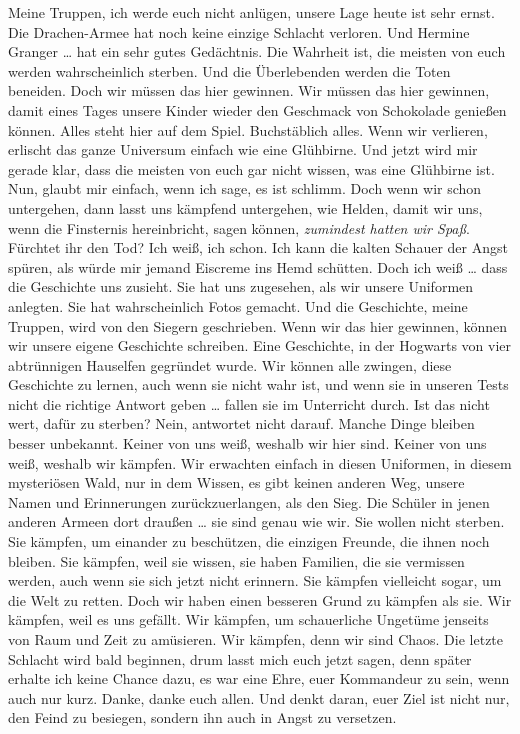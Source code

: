 Meine Truppen, ich werde euch nicht anlügen, unsere Lage heute ist sehr ernst. Die Drachen-Armee hat noch keine einzige Schlacht verloren. Und Hermine Granger … hat ein sehr gutes Gedächtnis. Die Wahrheit ist, die meisten von euch werden wahrscheinlich sterben. Und die Überlebenden werden die Toten beneiden. Doch wir müssen das hier gewinnen. Wir müssen das hier gewinnen, damit eines Tages unsere Kinder wieder den Geschmack von Schokolade genießen können. Alles steht hier auf dem Spiel. Buchstäblich alles. Wenn wir verlieren, erlischt das ganze Universum einfach wie eine Glühbirne. Und jetzt wird mir gerade klar, dass die meisten von euch gar nicht wissen, was eine Glühbirne ist. Nun, glaubt mir einfach, wenn ich sage, es ist schlimm. Doch wenn wir schon untergehen, dann lasst uns kämpfend untergehen, wie Helden, damit wir uns, wenn die Finsternis hereinbricht, sagen können, \emph{zumindest hatten wir Spaß}. Fürchtet ihr den Tod? Ich weiß, ich schon. Ich kann die kalten Schauer der Angst spüren, als würde mir jemand Eiscreme ins Hemd schütten. Doch ich weiß … dass die Geschichte uns zusieht. Sie hat uns zugesehen, als wir unsere Uniformen anlegten. Sie hat wahrscheinlich Fotos gemacht. Und die Geschichte, meine Truppen, wird von den Siegern geschrieben. Wenn wir das hier gewinnen, können wir unsere eigene Geschichte schreiben. Eine Geschichte, in der Hogwarts von vier abtrünnigen Hauselfen gegründet wurde. Wir können alle zwingen, diese Geschichte zu lernen, auch wenn sie nicht wahr ist, und wenn sie in unseren Tests nicht die richtige Antwort geben … fallen sie im Unterricht durch. Ist das nicht wert, dafür zu sterben? Nein, antwortet nicht darauf. Manche Dinge bleiben besser unbekannt. Keiner von uns weiß, weshalb wir hier sind. Keiner von uns weiß, weshalb wir kämpfen. Wir erwachten einfach in diesen Uniformen, in diesem mysteriösen Wald, nur in dem Wissen, es gibt keinen anderen Weg, unsere Namen und Erinnerungen zurückzuerlangen, als den Sieg. Die Schüler in jenen anderen Armeen dort draußen … sie sind genau wie wir. Sie wollen nicht sterben. Sie kämpfen, um einander zu beschützen, die einzigen Freunde, die ihnen noch bleiben. Sie kämpfen, weil sie wissen, sie haben Familien, die sie vermissen werden, auch wenn sie sich jetzt nicht erinnern. Sie kämpfen vielleicht sogar, um die Welt zu retten. Doch wir haben einen besseren Grund zu kämpfen als sie. Wir kämpfen, weil es uns gefällt. Wir kämpfen, um schauerliche Ungetüme jenseits von Raum und Zeit zu amüsieren. Wir kämpfen, denn wir sind Chaos. Die letzte Schlacht wird bald beginnen, drum lasst mich euch jetzt sagen, denn später erhalte ich keine Chance dazu, es war eine Ehre, euer Kommandeur zu sein, wenn auch nur kurz. Danke, danke euch allen. Und denkt daran, euer Ziel ist nicht nur, den Feind zu besiegen, sondern ihn auch in Angst zu versetzen.

